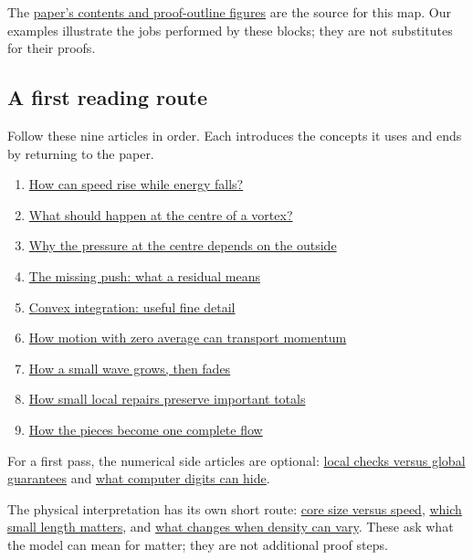 \documentclass[
  english,
  11pt,
]{article}
\providecommand{\tightlist}{%
  \setlength{\itemsep}{0pt}\setlength{\parskip}{0pt}}
\begin{document}
The
\href{https://cdn.openai.com/pdf/32d9f210-8b73-45e0-91bc-82a30aef8a9a/navier-stokes.pdf\#page=13}{paper's
contents and proof-outline figures} are the source for this map. Our
examples illustrate the jobs performed by these blocks; they are not
substitutes for their proofs.

\subsection{A first reading route}\label{a-first-reading-route}

Follow these nine articles in order. Each introduces the concepts it
uses and ends by returning to the paper.

\begin{enumerate}
\def\labelenumi{\arabic{enumi}.}
\tightlist
\item
  \href{../d2_finite_energy/article.html}{How can speed rise while
  energy falls?}
\item
  \href{../d6_inner_profile/article.html}{What should happen at the
  centre of a vortex?}
\item
  \href{../d6_axis_pressure/article.html}{Why the pressure at the centre
  depends on the outside}
\item
  \href{../d3_residual/article.html}{The missing push: what a residual
  means}
\item
  \href{../convex-integration/article.html}{Convex integration: useful
  fine detail}
\item
  \href{../d4_mean_stress/article.html}{How motion with zero average can
  transport momentum}
\item
  \href{../d5_shearing_wave/article.html}{How a small wave grows, then
  fades}
\item
  \href{../d6_moment_correction/article.html}{How small local repairs
  preserve important totals}
\item
  \href{../completing-the-flow/article.html}{How the pieces become one
  complete flow}
\end{enumerate}

For a first pass, the numerical side articles are optional:
\href{../d6_global_axis/article.html}{local checks versus global
guarantees} and \href{../d7_conditioning/article.html}{what computer
digits can hide}.

The physical interpretation has its own short route:
\href{../d1_core_size/article.html}{core size versus speed},
\href{../d9_regime_map/article.html}{which small length matters}, and
\href{../d10_compressible_vortex/article.html}{what changes when density
can vary}. These ask what the model can mean for matter; they are not
additional proof steps.
\end{document}
